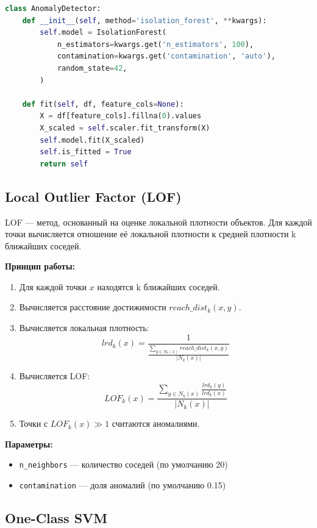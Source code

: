 \begin{lstlisting}[caption=Инициализация и обучение Isolation Forest, label=lst:if, language=Python]
class AnomalyDetector:
    def __init__(self, method='isolation_forest', **kwargs):
        self.model = IsolationForest(
            n_estimators=kwargs.get('n_estimators', 100),
            contamination=kwargs.get('contamination', 'auto'),
            random_state=42,
        )

    def fit(self, df, feature_cols=None):
        X = df[feature_cols].fillna(0).values
        X_scaled = self.scaler.fit_transform(X)
        self.model.fit(X_scaled)
        self.is_fitted = True
        return self
\end{lstlisting}

\subsection{Local Outlier Factor (LOF)}

LOF — метод, основанный на оценке локальной плотности объектов. Для каждой точки вычисляется отношение её локальной плотности к средней плотности k ближайших соседей.

\textbf{Принцип работы:}
\begin{enumerate}
    \item Для каждой точки \(x\) находятся k ближайших соседей.
    \item Вычисляется расстояние достижимости \(reach\_dist_k(x, y)\).
    \item Вычисляется локальная плотность:
    \[
    lrd_k(x) = \frac{1}{\frac{\sum_{y \in N_k(x)} reach\_dist_k(x, y)}{|N_k(x)|}}
    \]
    \item Вычисляется LOF:
    \[
    LOF_k(x) = \frac{\sum_{y \in N_k(x)} \frac{lrd_k(y)}{lrd_k(x)}}{|N_k(x)|}
    \]
    \item Точки с \(LOF_k(x) \gg 1\) считаются аномалиями.
\end{enumerate}

\textbf{Параметры:}
\begin{itemize}
    \item \texttt{n\_neighbors} — количество соседей (по умолчанию 20)
    \item \texttt{contamination} — доля аномалий (по умолчанию 0.15)
\end{itemize}

\subsection{One-Class SVM}

